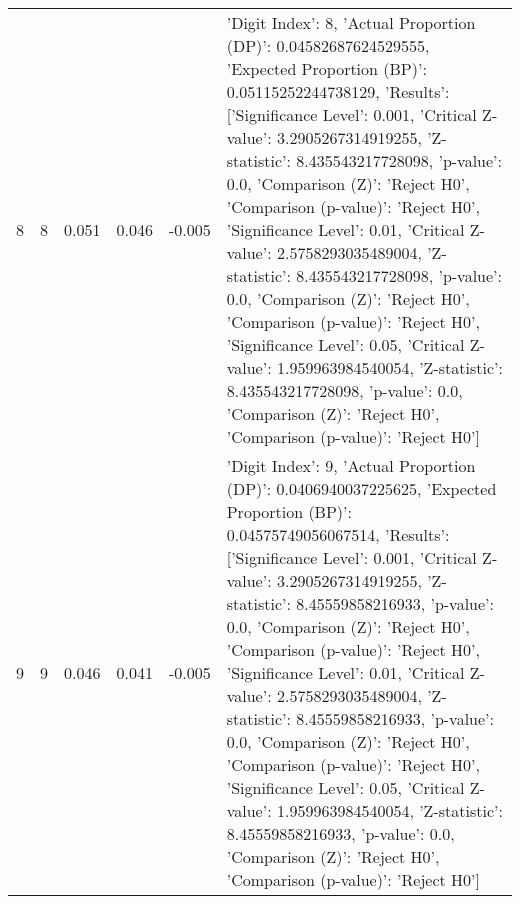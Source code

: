 \begin{tabular}{lrrrrl}
8 & 8 & 0.051 & 0.046 & -0.005 & {'Digit Index': 8, 'Actual Proportion (DP)': 0.04582687624529555, 'Expected Proportion (BP)': 0.05115252244738129, 'Results': [{'Significance Level': 0.001, 'Critical Z-value': 3.2905267314919255, 'Z-statistic': 8.435543217728098, 'p-value': 0.0, 'Comparison (Z)': 'Reject H0', 'Comparison (p-value)': 'Reject H0'}, {'Significance Level': 0.01, 'Critical Z-value': 2.5758293035489004, 'Z-statistic': 8.435543217728098, 'p-value': 0.0, 'Comparison (Z)': 'Reject H0', 'Comparison (p-value)': 'Reject H0'}, {'Significance Level': 0.05, 'Critical Z-value': 1.959963984540054, 'Z-statistic': 8.435543217728098, 'p-value': 0.0, 'Comparison (Z)': 'Reject H0', 'Comparison (p-value)': 'Reject H0'}]} \\
9 & 9 & 0.046 & 0.041 & -0.005 & {'Digit Index': 9, 'Actual Proportion (DP)': 0.0406940037225625, 'Expected Proportion (BP)': 0.04575749056067514, 'Results': [{'Significance Level': 0.001, 'Critical Z-value': 3.2905267314919255, 'Z-statistic': 8.45559858216933, 'p-value': 0.0, 'Comparison (Z)': 'Reject H0', 'Comparison (p-value)': 'Reject H0'}, {'Significance Level': 0.01, 'Critical Z-value': 2.5758293035489004, 'Z-statistic': 8.45559858216933, 'p-value': 0.0, 'Comparison (Z)': 'Reject H0', 'Comparison (p-value)': 'Reject H0'}, {'Significance Level': 0.05, 'Critical Z-value': 1.959963984540054, 'Z-statistic': 8.45559858216933, 'p-value': 0.0, 'Comparison (Z)': 'Reject H0', 'Comparison (p-value)': 'Reject H0'}]} \\
\bottomrule
\end{tabular}
